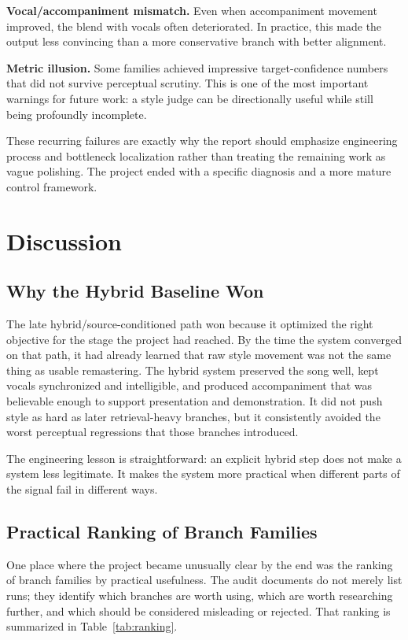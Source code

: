 \documentclass[conference]{IEEEtran}
\begin{document}
\textbf{Vocal/accompaniment mismatch.} Even when accompaniment movement improved, the blend with vocals often deteriorated. In practice, this made the output less convincing than a more conservative branch with better alignment.

\textbf{Metric illusion.} Some families achieved impressive target-confidence numbers that did not survive perceptual scrutiny. This is one of the most important warnings for future work: a style judge can be directionally useful while still being profoundly incomplete.

These recurring failures are exactly why the report should emphasize engineering process and bottleneck localization rather than treating the remaining work as vague polishing. The project ended with a specific diagnosis and a more mature control framework.

\section{Discussion}
\subsection{Why the Hybrid Baseline Won}
The late hybrid/source-conditioned path won because it optimized the right objective for the stage the project had reached. By the time the system converged on that path, it had already learned that raw style movement was not the same thing as usable remastering. The hybrid system preserved the song well, kept vocals synchronized and intelligible, and produced accompaniment that was believable enough to support presentation and demonstration. It did not push style as hard as later retrieval-heavy branches, but it consistently avoided the worst perceptual regressions that those branches introduced.

The engineering lesson is straightforward: an explicit hybrid step does not make a system less legitimate. It makes the system more practical when different parts of the signal fail in different ways.

\subsection{Practical Ranking of Branch Families}
One place where the project became unusually clear by the end was the ranking of branch families by practical usefulness. The audit documents do not merely list runs; they identify which branches are worth using, which are worth researching further, and which should be considered misleading or rejected. That ranking is summarized in Table~\ref{tab:ranking}.
\end{document}
